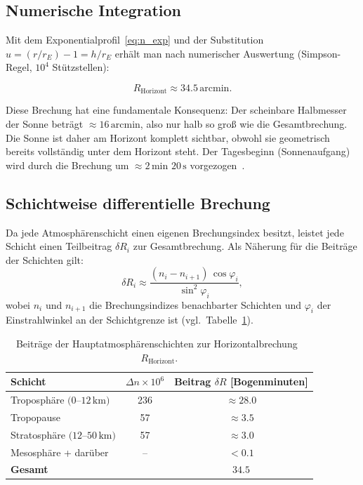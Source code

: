 \documentclass[12pt,a4paper]{article}
\providecommand{\SI}[2]{\ensuremath{#1\,#2}}
\providecommand{\ang}[1]{\ensuremath{#1\,\mathrm{arcmin}}}
\providecommand{\second}{\mathrm{s}}
\providecommand{\minute}{\mathrm{min}}
\begin{document}
\subsection{Numerische Integration}

Mit dem Exponentialprofil~\eqref{eq:n_exp} und
der Substitution $u = (r/r_E) - 1 = h/r_E$ erhält man
nach numerischer Auswertung (Simpson-Regel, $10^4$ Stützstellen):

\begin{equation}
  R_{\text{Horizont}} \approx \ang{34.5}.
  \label{eq:R_horizont}
\end{equation}

Diese Brechung hat eine fundamentale Konsequenz:
Der scheinbare Halbmesser der Sonne beträgt $\approx \ang{16}$,
also nur halb so groß wie die Gesamtbrechung.
Die Sonne ist daher am Horizont komplett sichtbar,
obwohl sie geometrisch bereits vollständig unter dem Horizont steht.
Der Tagesbeginn (Sonnenaufgang) wird durch die Brechung um
$\approx \SI{2}{\minute}$ \SI{20}{\second} vorgezogen~\citep{Meeus1991}.

\subsection{Schichtweise differentielle Brechung}

Da jede Atmosphärenschicht einen eigenen Brechungsindex besitzt,
leistet jede Schicht einen Teilbeitrag $\delta R_i$ zur Gesamtbrechung.
Als Näherung für die Beiträge der Schichten gilt:
\begin{equation}
  \delta R_i \approx
  \frac{(n_i - n_{i+1})\,\cos\varphi_i}{\sin^2\varphi_i},
  \label{eq:dR_schicht}
\end{equation}
wobei $n_i$ und $n_{i+1}$ die Brechungsindizes benachbarter Schichten
und $\varphi_i$ der Einstrahlwinkel an der Schichtgrenze ist
(vgl.\ Tabelle~\ref{tab:schicht_beitrag}).

\begin{table}[htbp]
\centering
\caption{Beiträge der Hauptatmosphärenschichten zur
         Horizontalbrechung~$R_{\text{Horizont}}$.}
\label{tab:schicht_beitrag}
\begin{tabular}{lcc}
\toprule
Schicht & $\Delta n \times 10^6$ & Beitrag $\delta R$ [Bogenminuten] \\
\midrule
Troposphäre $(0$--$12\,\text{km})$  & 236 & $\approx 28.0$ \\
Tropopause                          &  57 & $\approx  3.5$ \\
Stratosphäre $(12$--$50\,\text{km})$&  57 & $\approx  3.0$ \\
Mesosphäre + darüber                &  -- & $< 0.1$        \\
\midrule
\textbf{Gesamt}                    &     & $\mathbf{34.5}$ \\
\bottomrule
\end{tabular}
\end{table}
\end{document}

